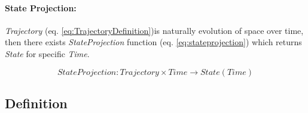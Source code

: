     \paragraph{State Projection:} \emph{Trajectory} (eq. \ref{eq:TrajectoryDefinition})is naturally evolution of space over time, then there exists \emph{StateProjection} function (eq. \ref{eq:stateprojection}) which returns \emph{State} for specific \emph{Time}.
    
    \begin{equation}\label{eq:stateprojection}
        StateProjection:Trajectory\times Time \to State(Time)
    \end{equation}
    
\subsection{Definition}\label{s:MovementAutomatonDefinitionAndProperties}

